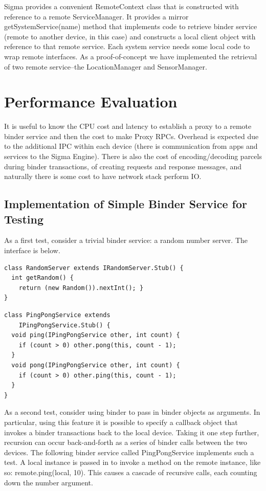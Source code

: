\documentclass[prodmode]{acmlarge}
\begin{document}
Sigma provides a convenient RemoteContext class that is constructed with reference to a remote ServiceManager. It provides a mirror getSystemService(name) method that implements code to retrieve binder service (remote to another device, in this case) and constructs a local client object with reference to that remote service. Each system service needs some local code to wrap remote interfaces. As a proof-of-concept we have implemented the retrieval of two remote service--the LocationManager and SensorManager.

\section{Performance Evaluation}
It is useful to know the CPU cost and latency to establish a proxy to a remote binder service and then the cost to make Proxy RPCs. Overhead is expected due to the additional IPC within each device (there is communication from apps and services to the Sigma Engine). There is also the cost of encoding/decoding parcels during binder transactions, of creating requests and response messages, and naturally there is some cost to have network stack perform IO.

\subsection{Implementation of Simple Binder Service for Testing}
As a first test, consider a trivial binder service: a random number server. The interface is below.
\begin{Verbatim}[samepage=true]
class RandomServer extends IRandomServer.Stub() {
  int getRandom() { 
    return (new Random()).nextInt(); }
}
\end{Verbatim}


\begin{Verbatim}[samepage=true]
class PingPongService extends
    IPingPongService.Stub() {
  void ping(IPingPongService other, int count) {
    if (count > 0) other.pong(this, count - 1);
  }
  void pong(IPingPongService other, int count) {
    if (count > 0) other.ping(this, count - 1);
  }
}
\end{Verbatim}

As a second test, consider using binder to pass in binder objects as arguments. In particular, using this feature it is possible to specify a callback object that invokes a binder transactions back to the local device. Taking it one step further, recursion can occur back-and-forth as a series of binder calls between the two devices. The following binder service called PingPongService implements such a test. A local instance is passed in to invoke a method on the remote instance, like so: remote.ping(local, 10). This causes a cascade of recursive calls, each counting down the number argument.
\end{document}
